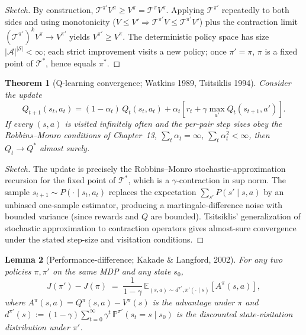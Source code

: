 \documentclass[11pt]{article}
\newtheorem{theorem}{Theorem}[section]
\newtheorem{lemma}[theorem]{Lemma}
\theoremstyle{remark}
\begin{document}
\begin{proof}[Sketch]
By construction, $\mathcal{T}^{\pi'} V^\pi \ge V^\pi = \mathcal{T}^\pi V^\pi$. Applying $\mathcal{T}^{\pi'}$ repeatedly to both sides and using monotonicity ($V\le V'\Rightarrow \mathcal{T}^{\pi'} V \le \mathcal{T}^{\pi'} V'$) plus the contraction limit $(\mathcal{T}^{\pi'})^k V^\pi \to V^{\pi'}$ yields $V^{\pi'} \ge V^\pi$. The deterministic policy space has size $|\mathcal{A}|^{|\mathcal{S}|} <\infty$; each strict improvement visits a new policy; once $\pi' = \pi$, $\pi$ is a fixed point of $\mathcal{T}^*$, hence equals $\pi^*$.
\end{proof}

\begin{theorem}[Q-learning convergence; Watkins 1989, Tsitsiklis 1994]
Consider the update
\[
Q_{t+1}(s_t,a_t) = (1-\alpha_t)\,Q_t(s_t,a_t) + \alpha_t\!\left[r_t + \gamma\max_{a'} Q_t(s_{t+1}, a')\right].
\]
If every $(s,a)$ is visited infinitely often and the per-pair step sizes obey the Robbins--Monro conditions of Chapter~13, $\sum_t \alpha_t = \infty$, $\sum_t \alpha_t^2 <\infty$, then $Q_t \to Q^*$ almost surely.
\end{theorem}

\begin{proof}[Sketch]
The update is precisely the Robbins--Monro stochastic-approximation recursion for the fixed point of $\mathcal{T}^*$, which is a $\gamma$-contraction in sup norm. The sample $s_{t+1}\sim P(\cdot\mid s_t,a_t)$ replaces the expectation $\sum_{s'} P(s'\mid s,a)$ by an unbiased one-sample estimator, producing a martingale-difference noise with bounded variance (since rewards and $Q$ are bounded). Tsitsiklis' generalization of stochastic approximation to contraction operators gives almost-sure convergence under the stated step-size and visitation conditions.
\end{proof}

\begin{lemma}[Performance-difference; Kakade \& Langford, 2002]
\label{lem:pdl}
For any two policies $\pi, \pi'$ on the same MDP and any state $s_0$,
\[
  J(\pi') - J(\pi) \;=\; \frac{1}{1 - \gamma}\, \mathbb{E}_{(s, a) \sim d^{\pi'}, \pi'(\cdot \mid s)}\!\left[ A^\pi(s, a) \right],
\]
where $A^\pi(s, a) = Q^\pi(s, a) - V^\pi(s)$ is the advantage under $\pi$ and $d^{\pi'}(s) := (1 - \gamma) \sum_{t=0}^\infty \gamma^t \, \mathbb{P}^{\pi'}(s_t = s \mid s_0)$ is the discounted state-visitation distribution under $\pi'$.
\end{lemma}
\end{document}
